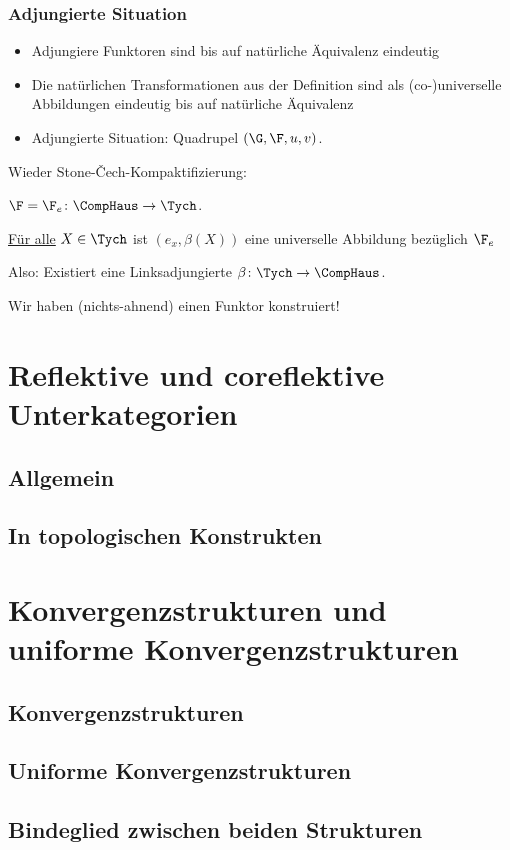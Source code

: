 \documentclass[serif,9pt]{beamer}
\begin{document}
\begin{frame}
  \frametitle{Adjungierte Situation}

  \begin{itemize}
    \item Adjungiere Funktoren sind bis auf natürliche Äquivalenz eindeutig
    \item Die natürlichen Transformationen aus der Definition sind als (co-)universelle Abbildungen eindeutig bis auf natürliche Äquivalenz
    \item Adjungierte Situation: Quadrupel $(\G, \F, u, v)$. 
  \end{itemize}

  \begin{ex*}
     Wieder Stone-\v{C}ech-Kompaktifizierung:

     $\F = \F_e \colon \CompHaus \to \Tych$.

     \underline{Für alle} $X \in \Tych$ ist $(e_x, \beta(X))$ eine universelle Abbildung bezüglich $\F_e$
     
     Also: Existiert eine Linksadjungierte $\beta \colon \Tych \to \CompHaus$.
     \vspace{1em}

     Wir haben (nichts-ahnend) einen Funktor konstruiert!
  \end{ex*}

\end{frame}


\section{Reflektive und coreflektive Unterkategorien}



\subsection{Allgemein}
\subsection{In topologischen Konstrukten}

\section{Konvergenzstrukturen und uniforme Konvergenzstrukturen}

\subsection{Konvergenzstrukturen}
\subsection{Uniforme Konvergenzstrukturen}
\subsection{Bindeglied zwischen beiden Strukturen}
\end{document}

